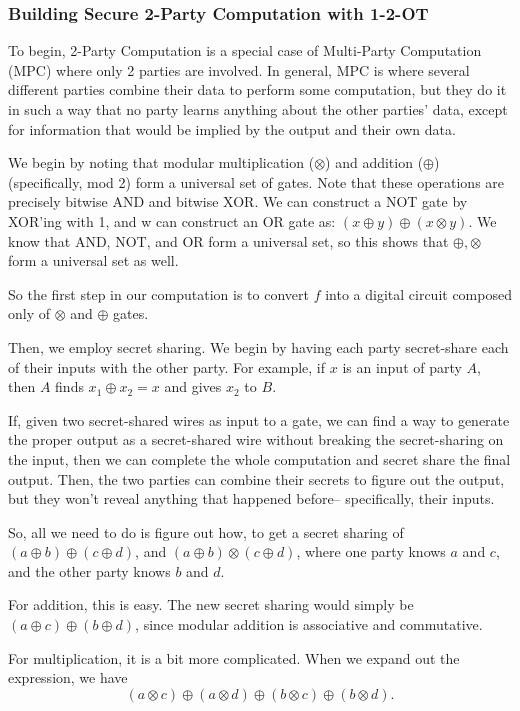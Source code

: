 \documentclass[11pt]{article}
\begin{document}
\subsubsection{Building Secure 2-Party Computation with 1-2-OT}

To begin, 2-Party Computation is a special case of Multi-Party Computation (MPC) where only 2 parties are involved.
In general, MPC is where several different parties combine their data to perform some computation,
but they do it in such a way that no party learns anything about the other parties' data,
except for information that would be implied by the output and their own data.\medskip

We begin by noting that modular multiplication (\(\otimes\)) and addition (\(\oplus\)) (specifically, mod 2) form a universal set of gates.
Note that these operations are precisely bitwise AND and bitwise XOR.
We can construct a NOT gate by XOR'ing with 1,
and w can construct an OR gate as: \((x\oplus y)\oplus (x\otimes y)\).
We know that AND, NOT, and OR form a universal set, so this shows that \(\oplus,\otimes\) form a universal set as well.

So the first step in our computation is to convert \(f\) into a digital circuit composed only of \(\otimes\) and \(\oplus\) gates.

Then, we employ secret sharing. We begin by having each party secret-share each of their inputs with the other party.
For example, if \(x\) is an input of party \(A\), then \(A\) finds \(x_1\oplus x_2=x\) and gives \(x_2\) to \(B\).

If, given two secret-shared wires as input to a gate, we can find a way to generate the proper output as a secret-shared wire without breaking the secret-sharing on the input,
then we can complete the whole computation and secret share the final output. 
Then, the two parties can combine their secrets to figure out the output,
but they won't reveal anything that happened before-- specifically, their inputs.

So, all we need to do is figure out how, to get a secret sharing of \((a\oplus b)\oplus(c\oplus d)\), and \((a\oplus b)\otimes(c\oplus d)\),
where one party knows \(a\) and \(c\), and the other party knows \(b\) and \(d\).\medskip

For addition, this is easy. The new secret sharing would simply be \((a\oplus c)\oplus (b\oplus d)\), since modular addition is associative and commutative.\smallskip

For multiplication, it is a bit more complicated. When we expand out the expression, we have
\[(a\otimes c)\oplus(a\otimes d)\oplus (b\otimes c)\oplus (b\otimes d).\]
\end{document}
